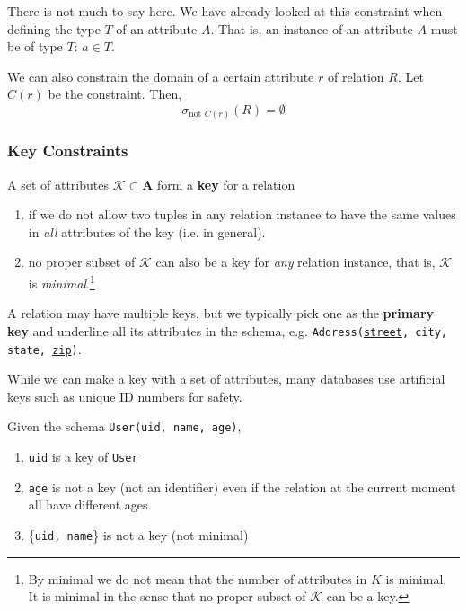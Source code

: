     There is not much to say here. We have already looked at this constraint when defining the type $T$ of an attribute $A$. That is, an instance of an attribute $A$ must be of type $T$: $a \in T$. 

    \begin{definition}
      We can also constrain the domain of a certain attribute $r$ of relation $R$. Let $C(r)$ be the constraint. Then, 
      \begin{equation}
        \sigma_{\text{not } C(r)} (R) = \emptyset
      \end{equation}
    \end{definition}

  \subsubsection{Key Constraints}

    \begin{definition}[Key]
      A set of attributes $\mathcal{K} \subset \mathbf{A}$ form a \textbf{key} for a relation 
      \begin{enumerate}
        \item if we do not allow two tuples in any relation instance to have the same values in \textit{all} attributes of the key (i.e. in general). 
        \item no proper subset of $\mathcal{K}$ can also be a key for \textit{any} relation instance, that is, $\mathcal{K}$ is \textit{minimal}.\footnote{By minimal we do not mean that the number of attributes in $K$ is minimal. It is minimal in the sense that no proper subset of $\mathcal{K}$ can be a key.}
      \end{enumerate}
      A relation may have multiple keys, but we typically pick one as the \textbf{primary key} and underline all its attributes in the schema, e.g. \texttt{Address(\underline{street}, city, state, \underline{zip})}. 
    \end{definition}

    While we can make a key with a set of attributes, many databases use artificial keys such as unique ID numbers for safety. 

    \begin{example}
      Given the schema \texttt{User(uid, name, age)}, 
      \begin{enumerate}
        \item \texttt{uid} is a key of \texttt{User} 
        \item \texttt{age} is not a key (not an identifier) even if the relation at the current moment all have different ages. 
        \item \{\texttt{uid, name}\} is not a key (not minimal)
      \end{enumerate}
    \end{example}

